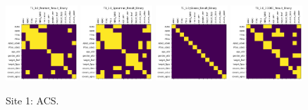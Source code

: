 \begin{figure}
    \includegraphics[width=0.24\textwidth]{chap6/figs/T1_1.0_Pearson_Result_Binary.png}
    \includegraphics[width=0.24\textwidth]{chap6/figs/T1_1.0_Spearman_Result_Binary.png}
    \includegraphics[width=0.24\textwidth]{chap6/figs/T1_1.0_Glasso_Result_Binary.png}
    \includegraphics[width=0.24\textwidth]{chap6/figs/T1_1.0_CODEC_Result_Binary.png}
    \caption{Site 1: ACS.}
    \label{fig:site1}
\end{figure}

